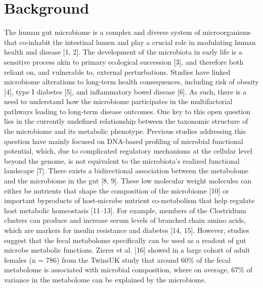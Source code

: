 \section{Background}
The human gut microbiome is a complex and diverse system of microorganisms that co-inhabit the intestinal  lumen and play a crucial role in modulating human health and disease [1, 2]. The development of the microbiota in early life is a sensitive process akin to primary ecological succession [3], and therefore both reliant on, and vulnerable to, external perturbations. Studies have linked microbiome alterations to long-term health consequences, including risk of obesity [4], type I diabetes [5], and inflammatory bowel disease [6]. As such, there is a need to understand how the microbiome participates in the multifactorial pathways leading to long-term disease outcomes. One key to this open question lies in the currently undefined relationship between the taxonomic structure of the microbiome and its metabolic phenotype. Previous studies addressing this question have mainly focused on DNA-based profiling of microbial functional potential, which, due to complicated regulatory mechanisms at the cellular level beyond the genome, is not equivalent to the microbiota’s realized functional landscape [7].  
There exists a bidirectional association between the metabolome and the microbiome in the gut [8, 9]. These low molecular weight molecules can either be nutrients that shape the composition of the microbiome [10] or important byproducts of host-microbe nutrient co-metabolism that help regulate host metabolic homeostasis [11–13]. For example, members of the Clostridium clusters can produce and increase serum levels of branched chain amino acids, which are markers for insulin resistance and diabetes [14, 15]. However, studies suggest that the fecal metabolome specifically can be used as a readout of gut microbe metabolic functions. Zierer et al. [16] showed in a large cohort of adult females (n = 786) from the TwinsUK study that around 60\% of the fecal metabolome is associated with microbial composition, where on average, 67\% of variance in the metabolome can be explained by the microbiome. 
